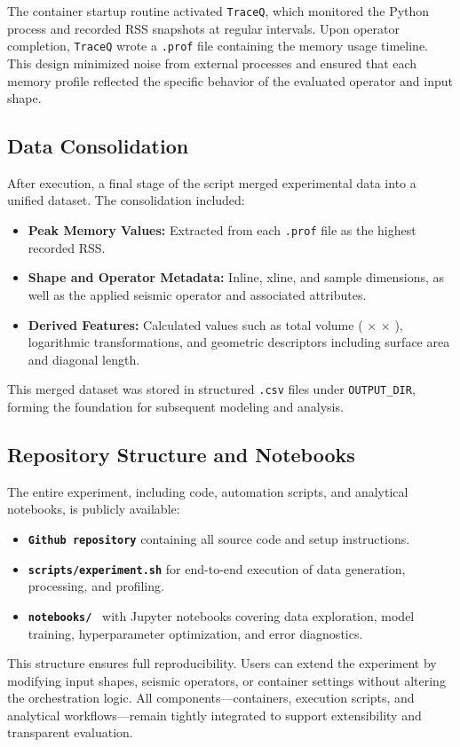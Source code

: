 The container startup routine activated \texttt{TraceQ}, which monitored the Python process and recorded \ac{RSS} snapshots at regular intervals.
Upon operator completion, \texttt{TraceQ} wrote a \texttt{.prof} file containing the memory usage timeline.
This design minimized noise from external processes and ensured that each memory profile reflected the specific behavior of the evaluated operator and input shape.

\subsection{Data Consolidation}
\label{subsec:data-consolidation}

After execution, a final stage of the script merged experimental data into a unified dataset.
The consolidation included:

\begin{itemize}
    \item \textbf{Peak Memory Values:} Extracted from each \texttt{.prof} file as the highest recorded \ac{RSS}.
    \item \textbf{Shape and Operator Metadata:} Inline, xline, and sample dimensions, as well as the applied seismic operator and associated attributes.
    \item \textbf{Derived Features:} Calculated values such as total volume ( $\times$  $\times$ ), logarithmic transformations, and geometric descriptors including surface area and diagonal length.
\end{itemize}

This merged dataset was stored in structured \texttt{.csv} files under \texttt{OUTPUT\_DIR}, forming the foundation for subsequent modeling and analysis.

\subsection{Repository Structure and Notebooks}
\label{subsec:repository-structure-and-notebooks}

The entire experiment, including code, automation scripts, and analytical notebooks, is publicly available:
\begin{itemize}
    \item \textbf{\texttt{Github repository}}\cite{delucca2025experiment2} containing all source code and setup instructions.
    \item \textbf{\texttt{scripts/experiment.sh}}\cite{delucca2025experiment2script} for end-to-end execution of data generation, processing, and profiling.
    \item \textbf{\texttt{notebooks/}}~\cite{delucca2025experiment2notebooks} with Jupyter notebooks covering data exploration, model training, hyperparameter optimization, and error diagnostics.
\end{itemize}

This structure ensures full reproducibility.
Users can extend the experiment by modifying input shapes, seismic operators, or container settings without altering the orchestration logic.
All components—containers, execution scripts, and analytical workflows—remain tightly integrated to support extensibility and transparent evaluation.